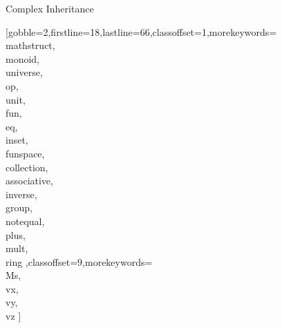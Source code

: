 \documentclass[lang={en,de}]{stex}
\begin{document}
  \begin{sfragment}{Complex Inheritance}


    [gobble=2,firstline=18,lastline=66,classoffset=1,morekeywords={
    \\mathstruct,\\monoid,\\universe,\\op,\\unit,\\fun,\\eq,\\inset,
    \\funspace,\\collection,\\associative,\\inverse,\\group,\\notequal,
    \\plus,\\mult,\\ring
    },classoffset=9,morekeywords={
      \\Ms,\\vx,\\vy,\\vz
    }]
    
  \end{sfragment}
\end{document}
